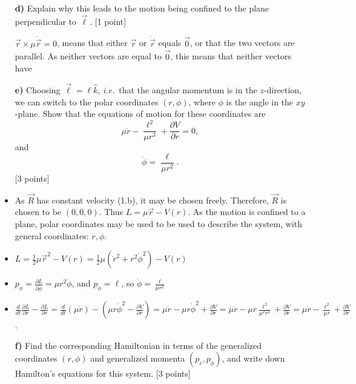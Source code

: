 \documentclass[11pt,a4paper]{report}
\newcounter{excount}[chapter]
\newenvironment{exercise}[1][]{\addtocounter{excount}{1} \noindent {\bf Question
    \arabic{excount} \ \ #1}\hspace{2mm}}{\vspace{4mm}}
\begin{document}
\begin{exercise}{\bf Central potentials\\}
\begin{itemize}
\item[{\bf d)}] Explain why this leads to the motion being confined to the plane perpendicular to $\vec\ell$. [1 point]

$\vec{r} \times \mu \dot{\vec{r}}=0$, means that either $\vec{r} $ or $\dot{\vec{r}}$ equals $\vec{0}$, or that the two vectors are parallel. As neither vectors are equal to $\vec{0}$, this means that neither vectors have


\item[{\bf e)}] Choosing $\vec\ell= \ell\hat k$, {\it i.e.}\ that the angular momentum is in the $z$-direction, we can switch to the polar coordinates $(r,\phi)$, where $\phi$ is the angle in the $xy$-plane. Show that the equations of motion for these coordinates are
\begin{equation}
\mu\ddot r-\frac{\ell^2}{\mu r^3}+\frac{\partial V}{\partial r}=0,\label{eq:LEQ_r}
\end{equation}
and
\begin{equation}
\dot\phi=\frac{\ell}{\mu r^2}\label{eq:LEQ_phi}.
\end{equation}
[3 points]

\item As $\vec{R}$ has constant velocity (1.b), it may be chosen freely. Therefore, $\vec{R}$ is chosen to be $(0,0,0)$. Thus $L=\mu \vec{r}-V(r)$. As the motion is confined to a plane, polar coordinates may be used to be used to describe the system, with general coordinates: $r, \phi$.

\item $L=\frac{1}{2}\mu \vec{r}^2-V(r)=\frac{1}{2}\mu (\dot{r}^2+r^2\dot{\phi}^2)-V(r)$
\item $p_{\phi}=\frac{\partial L}{\partial \dot{\phi}}=\mu r^2 \dot{\phi}$, and $p_{\phi}=\ell$, so $\dot{\phi}=\frac{\ell}{\mu r^2}$
\item $\frac{d}{dt}\frac{\partial L}{\partial \dot{r}}-\frac{\partial L}{\partial r}=\frac{d}{dt}(\mu\dot{r})-(\mu r \dot{\phi}^2-\frac{\partial V}{\partial r})=\mu\ddot{r}-\mu r \dot{\phi}^2+\frac{\partial V}{\partial r}=\mu\ddot{r}-\mu r \frac{\ell^2}{\mu^2 r^2}+\frac{\partial V}{\partial r}=\mu\ddot{r}-\frac{\ell^2}{\mu r}+\frac{\partial V}{\partial r}$. 



\item[{\bf f)}] Find the corresponding Hamiltonian in terms of the generalized coordinates $(r,\phi)$ and generalized momenta $(p_r,p_\phi)$, and write down Hamilton's equations for this system.  [3 points]


\end{itemize}
\end{exercise}
\end{document}
